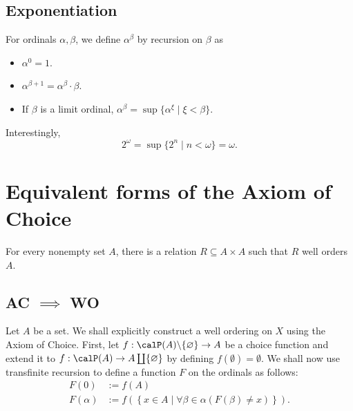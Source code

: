 \subsection*{Exponentiation}

\begin{definition}
    For ordinals $\alpha,\beta$, we define $\alpha^\beta$ by recursion on $\beta$ as 
    \begin{itemize}
        \item $\alpha^0 = 1$. 
        \item $\alpha^{\beta + 1} = \alpha^\beta\cdot\beta$. 
        \item If $\beta$ is a limit ordinal, $\alpha^\beta = \sup\{\alpha^\xi\mid\xi < \beta\}$. 
    \end{itemize}
\end{definition}

\begin{remark}
    Interestingly,
    \begin{equation*}
        2^\omega = \sup\{2^n\mid n < \omega\} = \omega.
    \end{equation*}
\end{remark}

\section{Equivalent forms of the Axiom of Choice}

\begin{theorem}
    For every nonempty set $A$, there is a relation $R\subseteq A\times A$ such that $R$ well orders $A$.
\end{theorem}

\subsection*{AC \texorpdfstring{$\implies$}{} WO}

Let $A$ be a set. We shall explicitly construct a well ordering on $X$ using the Axiom of Choice. First, let $f:\calP(A)\backslash\{\emptyset\}\to A$ be a choice function and extend it to $f:\calP(A)\to A\coprod\{\emptyset\}$ by defining $f(\emptyset) = \emptyset$. We shall now use transfinite recursion to define a function $F$ on the ordinals as follows: 
\begin{align*}
    F(0) &:= f(A)\\ 
    F(\alpha) &:= f\left(\left\{x\in A\mid\forall\beta\in\alpha(F(\beta)\ne x)\right\}\right).
\end{align*}


